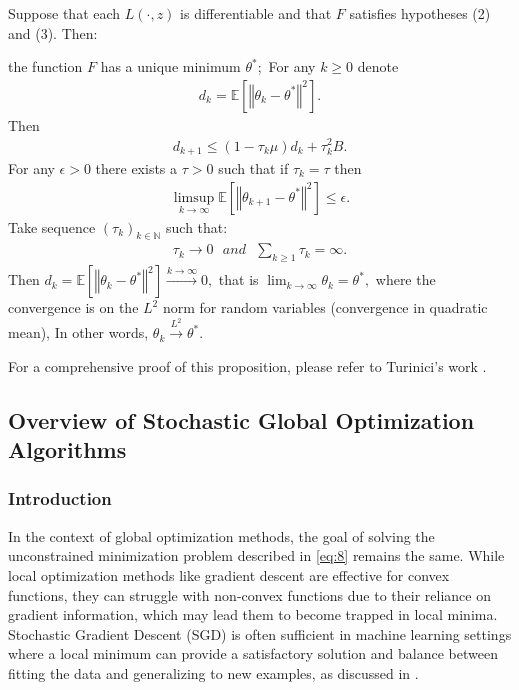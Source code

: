 \begin{proposition}\label{pf_sgd_conv_general}
Suppose that each $L(\cdot, z)$ is differentiable and that $F$ satisfies hypotheses (2) and (3). Then:\

the function $F$ has a unique minimum $\theta^{*}$;\
For any $k \geq 0$ denote
\begin{align}
d_{k} = \mathbb{E}[\left\Vert \theta_{k}-\theta^{*}\right\Vert^{2}]. \tag{4}
\end{align}
Then
\begin{align}
d_{k+1} \leq (1 - \tau_{k}\mu)d_{k} + \tau_{k}^{2}B. \tag{5}
\end{align}
For any $\epsilon > 0$ there exists a $\tau > 0$ such that if $\tau_{k} = \tau$ then
\begin{align}
\limsup_{k\rightarrow\infty}{\mathbb{E}[\left\Vert \theta_{k+1}-\theta^{*}\right\Vert^{2}]} \leq \epsilon. \tag{6}
\end{align}
Take sequence $(\tau_{k})_{k\in \mathbb{N}}$ such that:\
\begin{align}
\tau_{k} \rightarrow 0 \text{ } and \text{ } \sum_{k\geq 1} \tau_{k} = \infty. \tag{7}
\end{align}
Then $d_{k} = \mathbb{E}[\left\Vert \theta_{k}-\theta^{*}\right\Vert^{2}] \xrightarrow{k\rightarrow\infty} 0,$ that is $\lim_{k\rightarrow\infty}\theta_{k} = \theta^{*},$ where the convergence is on the $L^{2}$ norm for random variables (convergence in quadratic mean), In other words, $\theta_{k} \xrightarrow{L^{2}} \theta^{*}$.
\end{proposition}
For a comprehensive proof of this proposition, please refer to Turinici's work \cite{turinici2021convergence}.
\newpage
\subsection{Overview of Stochastic Global Optimization Algorithms}
\subsubsection{Introduction}
In the context of global optimization methods, the goal of solving the unconstrained minimization problem described in \eqref{eq:8} remains the same. While local optimization methods like gradient descent are effective for convex functions, they can struggle with non-convex functions due to their reliance on gradient information, which may lead them to become trapped in local minima. Stochastic Gradient Descent (SGD) is often sufficient in machine learning settings where a local minimum can provide a satisfactory solution and balance between fitting the data and generalizing to new examples, as discussed in \cite[282-290]{Goodfellow-et-al-2016}.

